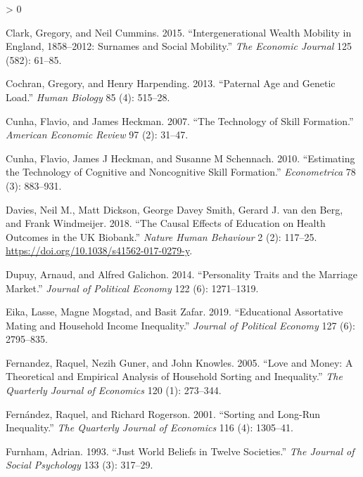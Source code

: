 \documentclass[
]{article}
\newlength{\cslhangindent}
\newenvironment{CSLReferences}[2] %
 {%
  \setlength{\parindent}{0pt}
  \ifodd #1 \everypar{\setlength{\hangindent}{\cslhangindent}}\ignorespaces\fi
  \ifnum #2 > 0
  \setlength{\parskip}{#2\baselineskip}
  \fi
 }%
 {}
\begin{document}
\begin{CSLReferences}{1}{0}
\leavevmode\hypertarget{ref-clark2015intergenerational}{}%
Clark, Gregory, and Neil Cummins. 2015. {``Intergenerational Wealth Mobility in England, 1858--2012: Surnames and Social Mobility.''} \emph{The Economic Journal} 125 (582): 61--85.

\leavevmode\hypertarget{ref-cochran2013paternal}{}%
Cochran, Gregory, and Henry Harpending. 2013. {``Paternal Age and Genetic Load.''} \emph{Human Biology} 85 (4): 515--28.

\leavevmode\hypertarget{ref-cunha2007technology}{}%
Cunha, Flavio, and James Heckman. 2007. {``The Technology of Skill Formation.''} \emph{American Economic Review} 97 (2): 31--47.

\leavevmode\hypertarget{ref-cunha2010estimating}{}%
Cunha, Flavio, James J Heckman, and Susanne M Schennach. 2010. {``Estimating the Technology of Cognitive and Noncognitive Skill Formation.''} \emph{Econometrica} 78 (3): 883--931.

\leavevmode\hypertarget{ref-Davies_2018}{}%
Davies, Neil M., Matt Dickson, George Davey Smith, Gerard J. van den Berg, and Frank Windmeijer. 2018. {``The Causal Effects of Education on Health Outcomes in the {UK} Biobank.''} \emph{Nature Human Behaviour} 2 (2): 117--25. \url{https://doi.org/10.1038/s41562-017-0279-y}.

\leavevmode\hypertarget{ref-dupuy2014personality}{}%
Dupuy, Arnaud, and Alfred Galichon. 2014. {``Personality Traits and the Marriage Market.''} \emph{Journal of Political Economy} 122 (6): 1271--1319.

\leavevmode\hypertarget{ref-eika2019educational}{}%
Eika, Lasse, Magne Mogstad, and Basit Zafar. 2019. {``Educational Assortative Mating and Household Income Inequality.''} \emph{Journal of Political Economy} 127 (6): 2795--835.

\leavevmode\hypertarget{ref-fernandez2005love}{}%
Fernandez, Raquel, Nezih Guner, and John Knowles. 2005. {``Love and Money: A Theoretical and Empirical Analysis of Household Sorting and Inequality.''} \emph{The Quarterly Journal of Economics} 120 (1): 273--344.

\leavevmode\hypertarget{ref-fernandez2001sorting}{}%
Fernández, Raquel, and Richard Rogerson. 2001. {``Sorting and Long-Run Inequality.''} \emph{The Quarterly Journal of Economics} 116 (4): 1305--41.

\leavevmode\hypertarget{ref-furnham1993just}{}%
Furnham, Adrian. 1993. {``Just World Beliefs in Twelve Societies.''} \emph{The Journal of Social Psychology} 133 (3): 317--29.


\end{CSLReferences}
\end{document}
